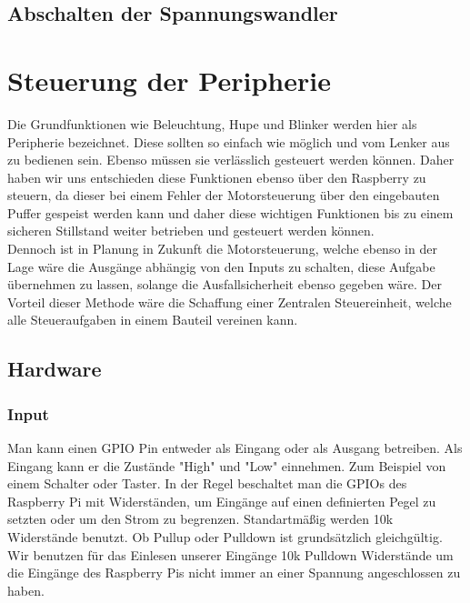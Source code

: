 \subsection{Abschalten der Spannungswandler}


\newpage


\section{Steuerung der Peripherie}

Die Grundfunktionen wie Beleuchtung, Hupe und Blinker werden hier als Peripherie bezeichnet. Diese sollten so einfach wie möglich und vom Lenker aus zu bedienen sein. Ebenso müssen sie verlässlich gesteuert werden können. Daher haben wir uns entschieden diese Funktionen ebenso über den Raspberry zu steuern, da dieser bei einem Fehler der Motorsteuerung über den eingebauten Puffer gespeist werden kann und daher diese wichtigen Funktionen bis zu einem sicheren Stillstand weiter betrieben und gesteuert werden können.\\
Dennoch ist in Planung in Zukunft die Motorsteuerung, welche ebenso in der Lage wäre die Ausgänge abhängig von den Inputs zu schalten, diese Aufgabe übernehmen zu lassen, solange die Ausfallsicherheit ebenso gegeben wäre. Der Vorteil dieser Methode wäre die Schaffung einer Zentralen Steuereinheit, welche alle Steueraufgaben in einem Bauteil vereinen kann.

\subsection{Hardware}

\subsubsection{Input}

Man kann einen GPIO Pin entweder als Eingang oder als Ausgang betreiben. Als Eingang kann er die Zustände "High" und "Low" einnehmen. Zum Beispiel von einem Schalter oder Taster. In der Regel beschaltet man die GPIOs des Raspberry Pi mit Widerständen, um Eingänge auf einen definierten Pegel zu setzten oder um den Strom zu begrenzen. Standartmäßig werden 10k Widerstände benutzt. Ob Pullup oder Pulldown ist grundsätzlich gleichgültig. Wir benutzen für das Einlesen unserer Eingänge 10k Pulldown Widerstände um die Eingänge des Raspberry Pis nicht immer an einer Spannung angeschlossen zu haben.


